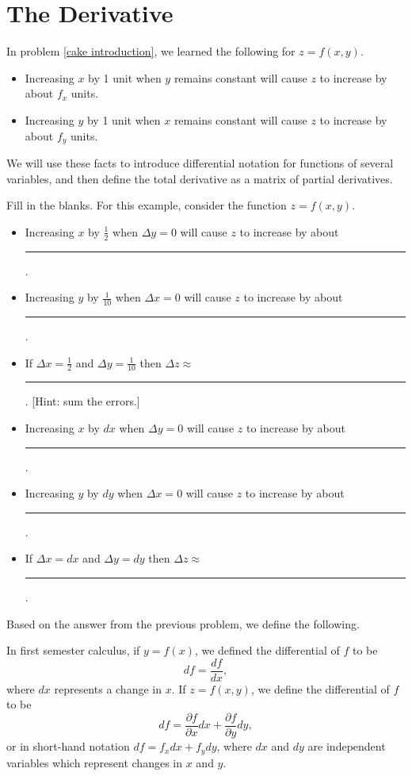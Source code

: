 \section{The Derivative}
\begin{remark}
 In problem \ref{cake introduction}, we learned the following for  $z=f(x,y)$.
\begin{itemize}
 \item Increasing $x$ by 1 unit when $y$ remains constant will cause $z$ to increase by about $f_x$ units.
 \item Increasing $y$ by 1 unit when $x$ remains constant will cause $z$ to increase by about $f_y$ units.
\end{itemize}
We will use these facts to introduce differential notation for functions of several variables, and then define the total derivative as a matrix of partial derivatives.
\end{remark}

\begin{problem}
 Fill in the blanks. For this example, consider the function $z=f(x,y)$.
\begin{itemize}
 \item Increasing $x$ by $\frac{1}{2}$ when $\Delta y=0$ will cause $z$ to increase by about \rule{1cm}{1pt}.
 \item Increasing $y$ by $\frac{1}{10}$ when $\Delta x=0$ will cause $z$ to increase by about \rule{1cm}{1pt}.
 \item If $\Delta x=\frac{1}{2}$ and $\Delta y=\frac{1}{10}$ then $\Delta z\approx$ \rule{2cm}{1pt}. [Hint: sum the errors.]
 \item Increasing $x$ by $dx$ when $\Delta y=0$ will cause $z$ to increase by about \rule{1cm}{1pt}.
 \item Increasing $y$ by $dy$ when $\Delta x=0$ will cause $z$ to increase by about \rule{1cm}{1pt}.
 \item If $\Delta x=dx$ and $\Delta y=dy$ then $\Delta z\approx$ \rule{2cm}{1pt}.
\end{itemize}
\end{problem}

Based on the answer from the previous problem, we define the following.
\begin{definition}
In first semester calculus, if $y=f(x)$, we defined the differential of $f$ to be
$$df = \frac{df}{dx},$$ where $dx$ represents a change in $x$.
If $z=f(x,y)$, we define the differential of $f$ to be 
$$df= \frac{\partial f}{\partial x}dx+ \frac{\partial f}{\partial y}dy,$$
or in short-hand notation $df=f_xdx+f_ydy$, 
where $dx$ and $dy$ are independent variables which represent changes in $x$ and $y$.
\end{definition}

